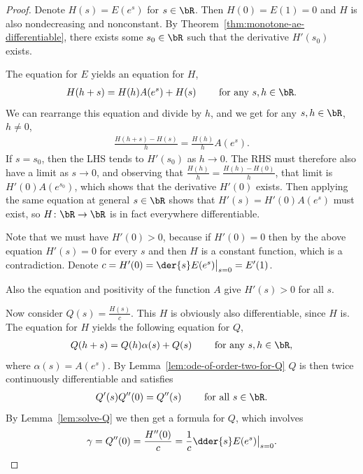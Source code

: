 \begin{proof}
  Denote $H(s) = E(e^s)$ for $s \in \bR$. Then $H(0) = E(1) = 0$ and
  $H$ is also nondecreasing and nonconstant.
  By Theorem~\ref{thm:monotone-ae-differentiable}, there
  exists some $s_0 \in \bR$ such that the derivative $H'(s_0)$ exists.

  The equation for $E$ yields an equation for $H$,
  \begin{align*}
  H(h+s) = H(h) A(e^{s}) + H(s) \qquad \text{ for any } s, h \in \bR.
  \end{align*}
  We can rearrange this equation and divide by $h$,
  and we get for any $s, h \in \bR$, $h \ne 0$,
  \begin{align*}
  \frac{H(h+s) - H(s)}{h} = \frac{H(h)}{h} A(e^{s}) .
  \end{align*}
  If $s = s_0$, then the LHS tends to $H'(s_0)$ as $h \to 0$.
  The RHS must therefore also have a limit as $s \to 0$, and
  observing that $\frac{H(h)}{h} = \frac{H(h) - H(0)}{h}$,
  that limit is $H'(0) A(e^{s_0})$, which shows that the derivative $H'(0)$ exists.
  Then applying the same equation at general $s \in \bR$ shows that
  $H'(s) = H'(0) A(e^{s})$ must exist, so $H \colon \bR \to \bR$ is
  in fact everywhere differentiable.

  Note that we must have $H'(0) > 0$, because if $H'(0) = 0$
  then by the above equation $H'(s) = 0$ for every $s$ and then
  $H$ is a constant function, which is a contradiction.
  Denote $c = H'(0) = \der{s} E(e^s) \big|_{s=0} = E'(1)$.

  Also the equation and positivity of the function $A$ give $H'(s)>0$
  for all $s$. %

  Now consider $Q(s) = \frac{H(s)}{c}$. This $H$ is
  obviously also differentiable, since $H$ is. The equation
  for $H$ yields the following equation for $Q$,
  \begin{align*}
    Q(h+s) = Q(h) \alpha(s) + Q(s) \qquad \text{ for any } s,h \in \bR ,
  \end{align*}
  where $\alpha(s) = A(e^{s})$.
  By Lemma~\ref{lem:ode-of-order-two-for-Q} $Q$ is then twice
  continuously differentiable and satisfies
  \begin{align}
  Q'(s) Q'' (0) = Q'' (s) \qquad \text{ for all } s \in \bR .
  \end{align}
  By Lemma~\ref{lem:solve-Q} we then get
  a formula for $Q$, which involves
  \begin{align*}
  \gamma = Q''(0) = \frac{H''(0)}{c}
    = \frac{1}{c} \dder{s} E(e^s) \big|_{s = 0} .
  \end{align*}


\end{proof}
